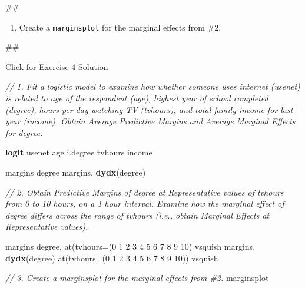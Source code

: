 \documentclass[
]{book}
\newenvironment{Shaded}{\begin{snugshade}}{\end{snugshade}}
\newcommand{\CommentTok}[1]{\textcolor[rgb]{0.56,0.35,0.01}{\textit{#1}}}
\newcommand{\FunctionTok}[1]{\textcolor[rgb]{0.00,0.00,0.00}{#1}}
\newcommand{\KeywordTok}[1]{\textcolor[rgb]{0.13,0.29,0.53}{\textbf{#1}}}
\newcommand{\NormalTok}[1]{#1}
\providecommand{\tightlist}{%
  \setlength{\itemsep}{0pt}\setlength{\parskip}{0pt}}
\begin{document}
\begin{Shaded}
\begin{Highlighting}[]
\NormalTok{\#\#}
\end{Highlighting}
\end{Shaded}

\begin{enumerate}
\def\labelenumi{\arabic{enumi}.}
\setcounter{enumi}{2}
\tightlist
\item
  Create a \texttt{marginsplot} for the marginal effects from \#2.
\end{enumerate}

\begin{Shaded}
\begin{Highlighting}[]
\NormalTok{\#\#}
\end{Highlighting}
\end{Shaded}

{Click for Exercise 4 Solution}

\begin{alert}

\begin{Shaded}
\begin{Highlighting}[]
\CommentTok{// 1. Fit a logistic model to examine how whether someone uses internet (\textasciigrave{}usenet\textasciigrave{}) is related to age of the respondent (\textasciigrave{}age\textasciigrave{}), highest year of school completed (\textasciigrave{}degree\textasciigrave{}), hours per day watching TV (\textasciigrave{}tvhours\textasciigrave{}), and total family income for last year (\textasciigrave{}income\textasciigrave{}). Obtain Average Predictive Margins and Average Marginal Effects for \textasciigrave{}degree\textasciigrave{}.}

\KeywordTok{logit}\NormalTok{ usenet age i.degree tvhours income }

\NormalTok{margins degree}
\NormalTok{margins, }\KeywordTok{dydx}\NormalTok{(degree)}

\CommentTok{// 2. Obtain Predictive Margins of \textasciigrave{}degree\textasciigrave{} at Representative values of \textasciigrave{}tvhours\textasciigrave{} from 0 to 10 hours, on a 1 hour interval. Examine how the marginal effect of \textasciigrave{}degree\textasciigrave{} differs across the range of \textasciigrave{}tvhours\textasciigrave{} (i.e., obtain Marginal Effects at Representative values). }

\NormalTok{margins degree, }\FunctionTok{at}\NormalTok{(tvhours=(0 1 2 3 4 5 6 7 8 9 10) vsquish }
\NormalTok{margins, }\KeywordTok{dydx}\NormalTok{(degree) }\FunctionTok{at}\NormalTok{(tvhours=(0 1 2 3 4 5 6 7 8 9 10)) vsquish }

\CommentTok{// 3. Create a \textasciigrave{}marginsplot\textasciigrave{} for the marginal effects from \#2. }
\NormalTok{marginsplot}
\end{Highlighting}
\end{Shaded}

\end{alert}
\end{document}
